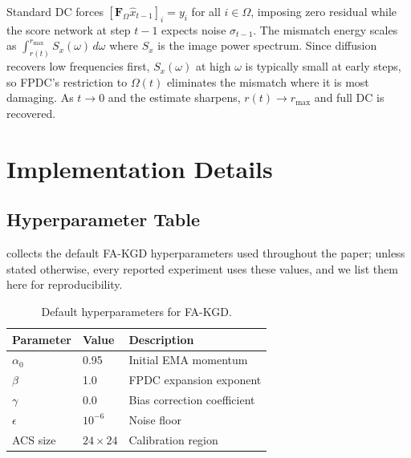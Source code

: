 \documentclass[10pt,twocolumn,letterpaper]{article}
\begin{document}
Standard DC forces $[\mathbf{F}_{\Omega}\hat{x}_{t-1}]_i = y_i$ for all $i
\in \Omega$, imposing zero residual while the score network at step $t-1$
expects noise $\sigma_{t-1}$. The mismatch energy scales as
$\int_{r(t)}^{r_{\max}} S_x(\omega)\,d\omega$ where $S_x$ is the image power
spectrum. Since diffusion recovers low frequencies first, $S_x(\omega)$ at
high $\omega$ is typically small at early steps, so FPDC's restriction to
$\Omega(t)$ eliminates the mismatch where it is most damaging. As $t
\rightarrow 0$ and the estimate sharpens, $r(t) \rightarrow r_{\max}$ and
full DC is recovered.

\section{Implementation Details}
\label{app:impl}

\subsection{Hyperparameter Table}

 collects the default FA-KGD hyperparameters used throughout
the paper; unless stated otherwise, every reported experiment uses these
values, and we list them here for reproducibility.

\begin{table}[h]
\centering
\caption{Default hyperparameters for FA-KGD.}
\label{tab:hparams}
\begin{tabular}{lll}
\toprule
\textbf{Parameter} & \textbf{Value} & \textbf{Description} \\
\midrule
$\alpha_0$ & 0.95 & Initial EMA momentum \\
$\beta$    & 1.0  & FPDC expansion exponent \\
$\gamma$   & 0.0  & Bias correction coefficient \\
$\epsilon$ & $10^{-6}$ & Noise floor \\
ACS size   & $24 \times 24$ & Calibration region \\
\bottomrule
\end{tabular}
\end{table}
\end{document}
